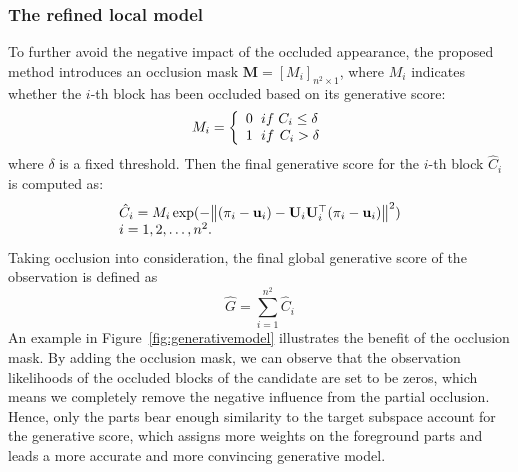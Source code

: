 \documentclass[preprint,12pt,review]{elsarticle}
\newcommand{\ignore}[1]{}
\begin{document}
\subsubsection{The refined local model}
To further avoid the negative impact of the occluded appearance, the proposed method introduces an occlusion mask $\mathbf{M}=[M_i]_{n^2 \times 1}$, where $M_i$ indicates whether the $i$-th block has been occluded based on its generative score:
\begin{equation}   \label{eq:mask}
{M_{i}} = \left\{ \begin{array}{l}
0{\kern 1pt} {\kern 1pt} {\kern 1pt} {\kern 1pt} {\kern 1pt} {\kern 1pt} if{\kern 1pt} {\kern 1pt} {\kern 1pt} {C_{i}} \le \delta \\
1{\kern 1pt} {\kern 1pt} {\kern 1pt} {\kern 1pt} {\kern 1pt} {\kern 1pt} if{\kern 1pt} {\kern 1pt} {\kern 1pt} {\kern 1pt} {C_{i}} > \delta
\end{array} \right.
\end{equation}
where $\delta$ is a fixed threshold.
Then the final generative score for the $i$-th block $\hat{C}_{i}$ is computed as:
\begin{equation}  \label{eq:refinedmask}
\begin{array}{l}
{\hat{C}_i} = {M_i}\exp ( - {\left\| {({\bf{\pi}}_i - {{\bf{u}}_i}) - {{\bf{U}}_i}{\bf{U}}_i^{\top}({\bf{\pi}}_i - {{\bf{u}}_i})} \right\|^2})\\
i = 1,2,\ldots,{n^2}.
\end{array}
\end{equation}
Taking occlusion into consideration, the final global generative score of the observation is defined as
\begin{equation} \label{eq:refinedmodel}
  \hat{G} = \sum \limits_{i=1}^{n^2} \hat{C}_i
\end{equation}
An example in Figure~\ref{fig:generativemodel} illustrates the benefit of the occlusion mask.
By adding the occlusion mask, we can observe that the observation likelihoods of the occluded blocks of the candidate are set to be zeros, which means we completely remove the negative influence from the partial occlusion.
Hence, only the parts bear enough similarity to the target subspace account for the generative score, which assigns more weights on the foreground parts and leads a more accurate and more convincing generative model.
\ignore{
Due to temporal contiguity of video clips, the occlusion masks between two consecutive frames remain almost the same.
Thus, the occlusion mask formed in frame $t$ is then used in frame ${t+1}$ to calculate $C_{i}$.
}
\end{document}
